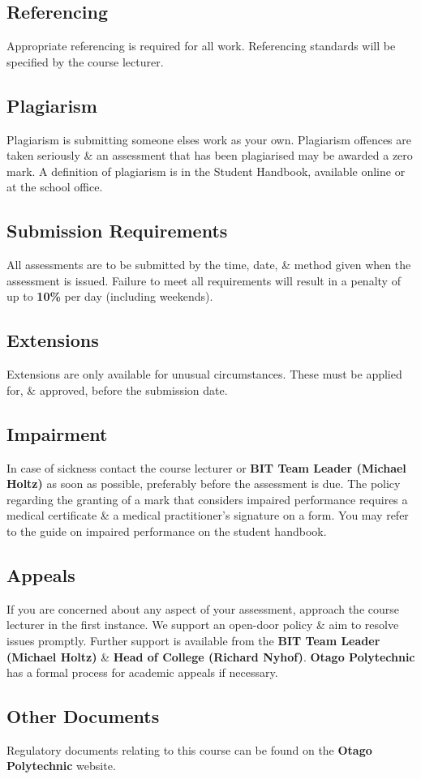 \documentclass{article}
\begin{document}
\subsection*{Referencing}
Appropriate referencing is required for all work. Referencing standards will be specified by the course lecturer.

\subsection*{Plagiarism}
Plagiarism is submitting someone elses work as your own. Plagiarism offences are taken seriously \& an assessment that has been plagiarised may be awarded a zero mark. A definition of plagiarism is in the Student Handbook, available online or at the school office.

\subsection*{Submission Requirements}
All assessments are to be submitted by the time, date, \& method given when the assessment is issued. Failure to meet all requirements will result in a penalty of up to \textbf{10\%} per day (including weekends).

\subsection*{Extensions}
Extensions are only available for unusual circumstances. These must be applied for, \& approved, before the submission date.

\subsection*{Impairment}
In case of sickness contact the course lecturer or \textbf{BIT Team Leader (Michael Holtz)} as soon as possible, preferably before the assessment is due. The policy regarding the granting of a mark that considers impaired performance requires a medical certificate \& a medical practitioner’s signature on a form. You may refer to the guide on impaired performance on the student handbook.

\subsection*{Appeals}
If you are concerned about any aspect of your assessment, approach the course lecturer in the first instance. We support an open-door policy \& aim to resolve issues promptly. Further support is available from the \textbf{BIT Team Leader (Michael Holtz)} \& \textbf{Head of College (Richard Nyhof)}. \textbf{Otago Polytechnic} has a formal process for academic appeals if necessary.

\subsection*{Other Documents}
Regulatory documents relating to this course can be found on the \textbf{Otago Polytechnic} website.
\end{document}
